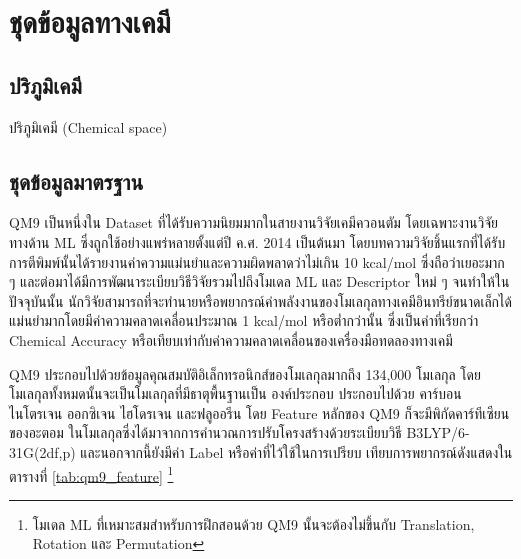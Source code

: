 

\chapter{ชุดข้อมูลทางเคมี}
\label{ch:dataset}

\section{ปริภูมิเคมี}

ปริภูมิเคมี (Chemical space)\autocite{kirkpatrick2004}

\section{ชุดข้อมูลมาตรฐาน}

QM9 เป็นหนึ่งใน Dataset ที่ได้รับความนิยมมากในสายงานวิจัยเคมีควอนตัม โดยเฉพาะงานวิจัยทางด้าน ML ซึ่งถูกใช้อย่างแพร่หลายตั้งแต่ปี ค.ศ. 
2014 เป็นต้นมา\autocite{ramakrishnan2014} โดยบทความวิจัยชิ้นแรกที่ได้รับการตีพิมพ์นั้นได้รายงานค่าความแม่นยำและความผิดพลาดว่าไม่เกิน 
10 kcal/mol ซึ่งถือว่าเยอะมาก ๆ และต่อมาได้มีการพัฒนาระเบียบวิธีวิจัยรวมไปถึงโมเดล ML และ Descriptor ใหม่ ๆ จนทำให้ในปัจจุบันนั้น%
นักวิจัยสามารถที่จะทำนายหรือพยากรณ์ค่าพลังงานของโมเลกุลทางเคมีอินทรีย์ขนาดเล็กได้แม่นยำมากโดยมีค่าความคลาดเคลื่อนประมาณ 1 kcal/mol 
หรือต่ำกว่านั้น ซึ่งเป็นค่าที่เรียกว่า Chemical Accuracy หรือเทียบเท่ากับค่าความคลาดเคลื่อนของเครื่องมือทดลองทางเคมี

QM9 ประกอบไปด้วยข้อมูลคุณสมบัติอิเล็กทรอนิกส์ของโมเลกุลมากถึง 134,000 โมเลกุล โดยโมเลกุลทั้งหมดนั้นจะเป็นโมเลกุลที่มีธาตุพื้นฐานเป็น%
องค์ประกอบ ประกอบไปด้วย คาร์บอน ไนโตรเจน ออกซิเจน ไฮโดรเจน และฟลูออรีน โดย Feature หลักของ QM9 ก็จะมีพิกัดคาร์ทีเซียนของอะตอม%
ในโมเลกุลซึ่งได้มาจากการคำนวณการปรับโครงสร้างด้วยระเบียบวิธี B3LYP/6-31G(2df,p) และนอกจากนี้ยังมีค่า Label หรือค่าที่ไว้ใช้ในการเปรียบ%
เทียบการพยากรณ์ดังแสดงในตารางที่ \ref{tab:qm9_feature}
\footnote{โมเดล ML ที่เหมาะสมสำหรับการฝึกสอนด้วย QM9 นั้นจะต้องไม่ขึ้นกับ Translation, Rotation และ Permutation}

